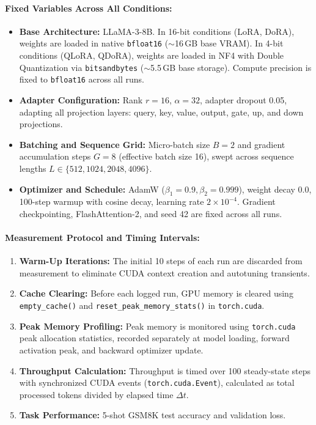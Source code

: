 \documentclass[11pt,a4paper]{article}
\begin{document}
\paragraph{Fixed Variables Across All Conditions:}
\begin{itemize}
    \item \textbf{Base Architecture:} LLaMA-3-8B. In 16-bit conditions (LoRA, DoRA), weights are loaded in native \texttt{bfloat16} ($\sim$16\,GB base VRAM). In 4-bit conditions (QLoRA, QDoRA), weights are loaded in NF4 with Double Quantization via \texttt{bitsandbytes} ($\sim$5.5\,GB base storage). Compute precision is fixed to \texttt{bfloat16} across all runs.
    \item \textbf{Adapter Configuration:} Rank $r = 16$, $\alpha = 32$, adapter dropout 0.05, adapting all projection layers: query, key, value, output, gate, up, and down projections.
    \item \textbf{Batching and Sequence Grid:} Micro-batch size $B = 2$ and gradient accumulation steps $G = 8$ (effective batch size 16), swept across sequence lengths $L \in \{512, 1024, 2048, 4096\}$.
    \item \textbf{Optimizer and Schedule:} AdamW ($\beta_1=0.9, \beta_2=0.999$), weight decay 0.0, 100-step warmup with cosine decay, learning rate $2 \times 10^{-4}$. Gradient checkpointing, FlashAttention-2, and seed 42 are fixed across all runs.
\end{itemize}

\paragraph{Measurement Protocol and Timing Intervals:}
\begin{enumerate}
    \item \textbf{Warm-Up Iterations:} The initial 10 steps of each run are discarded from measurement to eliminate CUDA context creation and autotuning transients.
    \item \textbf{Cache Clearing:} Before each logged run, GPU memory is cleared using \texttt{empty\_cache()} and \texttt{reset\_peak\_memory\_stats()} in \texttt{torch.cuda}.
    \item \textbf{Peak Memory Profiling:} Peak memory is monitored using \texttt{torch.cuda} peak allocation statistics, recorded separately at model loading, forward activation peak, and backward optimizer update.
    \item \textbf{Throughput Calculation:} Throughput is timed over 100 steady-state steps with synchronized CUDA events (\texttt{torch.cuda.Event}), calculated as total processed tokens divided by elapsed time $\Delta t$.
    \item \textbf{Task Performance:} 5-shot GSM8K test accuracy and validation loss.
\end{enumerate}
\end{document}
